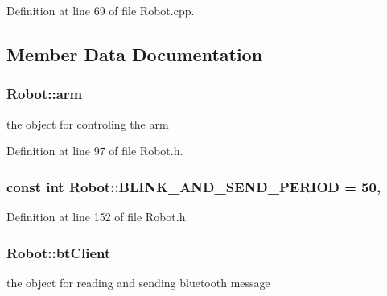 Definition at line 69 of file Robot.\-cpp.



\subsection{Member Data Documentation}
\hypertarget{classRobot_a444673862cbe384992aceb066282b500}{
\subsubsection[{arm}]{ Robot\-::arm}}\label{classRobot_a444673862cbe384992aceb066282b500}


the object for controling the arm 



Definition at line 97 of file Robot.\-h.

\hypertarget{classRobot_ad0f5c1ce14363f3c05232eceab37ceff}{
\subsubsection[{B\-L\-I\-N\-K\-\_\-\-A\-N\-D\-\_\-\-S\-E\-N\-D\-\_\-\-P\-E\-R\-I\-O\-D}]{\setlength{\rightskip}{0pt plus 5cm}const int Robot\-::\-B\-L\-I\-N\-K\-\_\-\-A\-N\-D\-\_\-\-S\-E\-N\-D\-\_\-\-P\-E\-R\-I\-O\-D = 50\hspace{0.3cm}{\ttfamily [static]}, {\ttfamily [private]}}}\label{classRobot_ad0f5c1ce14363f3c05232eceab37ceff}


Definition at line 152 of file Robot.\-h.

\hypertarget{classRobot_a9da91e6d551ed02038e935b3c755cc75}{
\subsubsection[{bt\-Client}]{ Robot\-::bt\-Client}}\label{classRobot_a9da91e6d551ed02038e935b3c755cc75}


the object for reading and sending bluetooth message 



